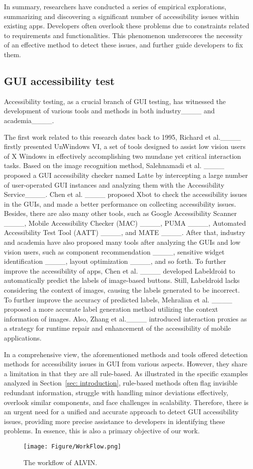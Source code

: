 In summary, researchers have conducted a series of empirical explorations, summarizing and discovering a significant number of accessibility issues within existing apps. 
Developers often overlook these problems due to constraints related to requirements and functionalities. 
This phenomenon underscores the necessity of an effective method to detect these issues, and further guide developers to fix them. 

\vspace{-0.42em}
\subsection{GUI accessibility test}
Accessibility testing, as a crucial branch of GUI testing, has witnessed the development of various tools and methods in both industry____ and academia____.

The first work related to this research dates back to 1995, Richard et al.____ firstly presented UnWindows VI, a set of tools designed to assist low vision users of X Windows in effectively accomplishing two mundane yet critical interaction tasks.
Based on the image recognition method, Salehnamadi et al. ____ proposed a GUI accessibility checker named Latte by intercepting a large number of user-operated GUI instances and analyzing them with the Accessibility Service____.
Chen et al. ____ proposed Xbot to check the accessibility issues in the GUIs, and made a better performance on collecting accessibility issues.
Besides, there are also many other tools, such as Google Accessibility Scanner ____, Mobile Accessibility Checker (MAC) ____, PUMA ____, Automated Accessibility Test Tool (AATT) ____, and MATE ____.
After that, industry and academia have also proposed many tools after analyzing the GUIs and low vision users, such as component recommendation ____, sensitive widget identification ____, layout optimization ____, and so forth.
To further improve the accessibility of apps, Chen et al. ____ developed Labeldroid to automatically predict the labels of image-based buttons.   
Still, Labeldroid lacks considering the context of images, causing the labels generated to be incorrect.
To further improve the accuracy of predicted labels, Mehralian et al. ____ proposed a more accurate label generation method utilizing the context information of images.
Also, Zhang et al.____ introduced interaction proxies as a strategy for runtime repair and enhancement of the accessibility of mobile applications.


In a comprehensive view, the aforementioned methods and tools offered detection methods for accessibility issues in GUI from various aspects. 
However, they share a limitation in that they are all rule-based. 
As illustrated in the specific examples analyzed in Section~\ref{sec: introduction}, rule-based methods often flag invisible redundant information, struggle with handling minor deviations effectively, overlook similar components, and face challenges in scalability. 
Therefore, there is an urgent need for a unified and accurate approach to detect GUI accessibility issues, providing more precise assistance to developers in identifying these problems. 
In essence, this is also a primary objective of our work.


\begin{figure*}
\centering
\texttt{[image: Figure/WorkFlow.png]}
\caption{The workflow of ALVIN.}
\label{fig: architecture}
\end{figure*}